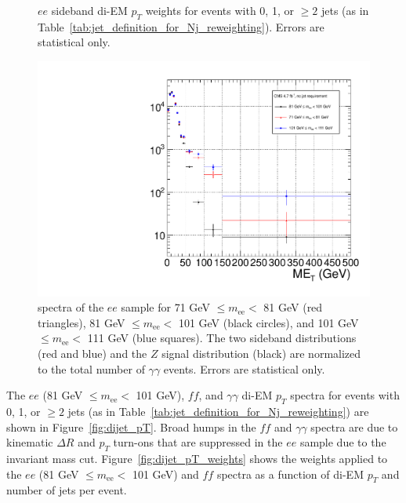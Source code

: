 \documentclass[dissertation_bw.tex]{subfiles}
\begin{document}
\begin{figure}
	\caption{$ee$ sideband di-EM $p_{T}$ weights for events with 0, 1, or $\geq 2$ jets (as in Table~\ref{tab:jet_definition_for_Nj_reweighting}).  Errors are statistical only.}
	\label{fig:ee_sideband_dijet_pT_weights}
\end{figure}

\begin{figure}
	\centering
	\includegraphics[scale=0.3]{all_ee_MET_spectra}
	\caption{\MET spectra of the $ee$ sample for 71 GeV $\leq m_{\mathrm{ee}} <$ 81 GeV (red triangles), 81 GeV $\leq m_{\mathrm{ee}} <$ 101 GeV (black circles), and 101 GeV $\leq m_{\mathrm{ee}} <$ 111 GeV (blue squares).  The two sideband distributions (red and blue) and the  $Z$ signal distribution (black) are normalized to the total number of $\gamma\gamma$ events.  Errors are statistical only.}
	\label{fig:all_ee_MET_spectra}
\end{figure}

The $ee$ (81 GeV $\leq m_{\mathrm{ee}} <$ 101 GeV), $\mathit{ff}$, and $\gamma\gamma$ di-EM $p_{T}$ spectra for events with 0, 1, or $\geq 2$ jets (as in Table~\ref{tab:jet_definition_for_Nj_reweighting}) are shown in Figure~\ref{fig:dijet_pT}.  Broad humps in the $\mathit{ff}$ and $\gamma\gamma$ spectra are due to kinematic $\Delta R$ and $p_{T}$ turn-ons that are suppressed in the $ee$ sample due to the invariant mass cut.  Figure~\ref{fig:dijet_pT_weights} shows the weights applied to the $ee$ (81 GeV $\leq m_{\mathrm{ee}} <$ 101 GeV) and $\mathit{ff}$ \MET spectra as a function of di-EM $p_{T}$ and number of jets per event.
\end{document}
